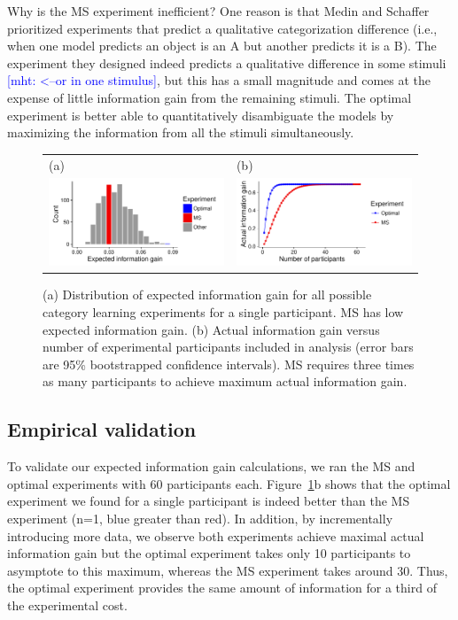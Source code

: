 \documentclass{article}
\newcommand{\mht}[1]{\textcolor{Blue}{[mht: #1]}}
\begin{document}
Why is the MS experiment inefficient?
One reason is that Medin and Schaffer prioritized experiments that predict a qualitative categorization difference (i.e., when one model predicts an object is an A  but another predicts it is a B).
The experiment they designed indeed predicts a qualitative difference in some stimuli \mht{<--or in one stimulus}, but this has a small magnitude and comes at the expense of little information gain from the remaining stimuli.
The optimal experiment is better able to quantitatively disambiguate the models by maximizing the information from all the stimuli simultaneously.

\begin{figure}[t]
\centering
\begin{tabular}{l l}
(a) & (b)\\
\includegraphics[width=2.5in]{img/category-eig-dist.pdf} & \includegraphics[width=2.5in]{img/category-aig-curve.pdf}\\
\end{tabular}
\caption{(a) Distribution of expected information gain for all possible category learning experiments for a single participant. MS has low expected information gain. (b) Actual information gain versus number of experimental participants included in analysis (error bars are 95\% bootstrapped confidence intervals). MS requires three times as many participants to achieve maximum actual information gain.}
\label{fig:dist}
\end{figure}

\subsection{Empirical validation}

To validate our expected information gain calculations, we ran the MS and optimal experiments with 60 participants each.
Figure~\ref{fig:dist}b shows that the optimal experiment we found for a single participant is indeed better than the MS experiment (n=1, blue greater than red).
In addition, by incrementally introducing more data, we observe both experiments achieve maximal actual information gain but the optimal experiment takes only 10 participants to asymptote to this maximum, whereas the MS experiment takes around 30.
Thus, the optimal experiment provides the same amount of information for a third of the experimental cost.
\end{document}
